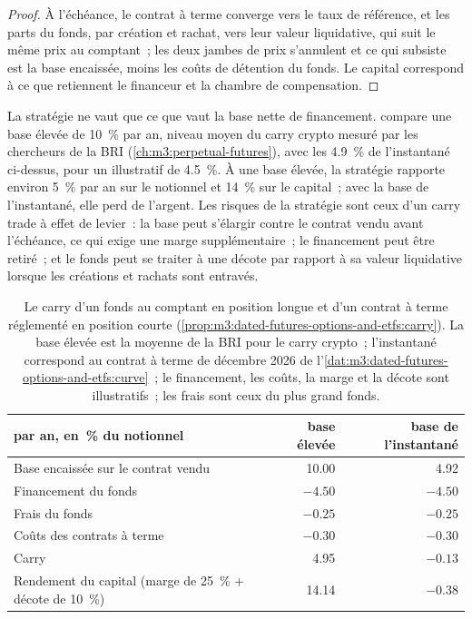 \begin{proof}
À l'échéance, le contrat à terme converge vers le taux de référence, et les parts du fonds, par création et rachat, vers leur valeur
liquidative, qui suit le même prix au comptant~; les deux jambes de prix s'annulent et ce qui subsiste est la base encaissée, moins les coûts de
détention du fonds. Le capital correspond à ce que retiennent le financeur et la chambre de compensation.
\end{proof}

La stratégie ne vaut que ce que vaut la base nette de financement.  compare une
base élevée de 10~\% par an, niveau moyen du carry crypto mesuré par les chercheurs de la BRI
(\cref{ch:m3:perpetual-futures}), avec les 4.9~\% de l'instantané ci-dessus, pour un  illustratif de 4.5~\%. À une
base élevée, la stratégie rapporte environ 5~\% par an sur le notionnel et 14~\% sur le capital~; avec la base de l'instantané, elle perd de l'argent. Les
risques de la stratégie sont ceux d'un carry trade à effet de levier~: la base peut s'élargir contre le contrat vendu avant l'échéance, ce qui exige
une marge supplémentaire~; le financement peut être retiré~; et le fonds peut se traiter à une décote par rapport à sa valeur liquidative lorsque les créations et
rachats sont entravés.

\begin{table}[ht]
\centering
\small
\begin{tabular}{@{}lrr@{}}
\toprule
par an, en~\% du notionnel & base élevée & base de l'instantané \\
\midrule
Base encaissée sur le contrat vendu & 10.00 & 4.92 \\
Financement du fonds & $-4.50$ & $-4.50$ \\
Frais du fonds & $-0.25$ & $-0.25$ \\
Coûts des contrats à terme & $-0.30$ & $-0.30$ \\
\midrule
Carry & 4.95 & $-0.13$ \\
Rendement du capital (marge de 25~\% + décote de 10~\%) & 14.14 & $-0.38$ \\
\bottomrule
\end{tabular}
\caption{Le carry d'un fonds au comptant en position longue et d'un contrat à terme réglementé en position courte (\cref{prop:m3:dated-futures-options-and-etfs:carry}). La
base élevée est la moyenne de la BRI pour le carry crypto~; l'instantané correspond au contrat à terme de décembre 2026 de
l'\cref{dat:m3:dated-futures-options-and-etfs:curve}~; le financement, les coûts, la marge et la décote sont illustratifs~; les frais sont ceux
du plus grand fonds.}\label{tab:m3:dated-futures-options-and-etfs:carry}
\end{table}

